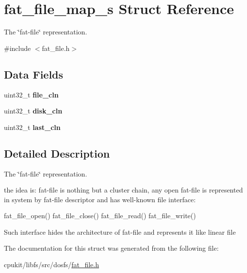 \hypertarget{structfat__file__map__s}{}\section{fat\+\_\+file\+\_\+map\+\_\+s Struct Reference}
\label{structfat__file__map__s}


The \char`\"{}fat-\/file\char`\"{} representation.  




{\ttfamily \#include $<$fat\+\_\+file.\+h$>$}

\subsection*{Data Fields}
\begin{DoxyCompactItemize}
\item 
\mbox{\label{structfat__file__map__s_a7dabe41f4a3cbb39490969db1c1d24f1}} 
uint32\+\_\+t {\bfseries file\+\_\+cln}
\item 
\mbox{\label{structfat__file__map__s_a01d4ec84a60b7ed09d088289dde42d85}} 
uint32\+\_\+t {\bfseries disk\+\_\+cln}
\item 
\mbox{\label{structfat__file__map__s_a14e861cadc0ea8ada504ff677072e606}} 
uint32\+\_\+t {\bfseries last\+\_\+cln}
\end{DoxyCompactItemize}


\subsection{Detailed Description}
The \char`\"{}fat-\/file\char`\"{} representation. 

the idea is\+: fat-\/file is nothing but a cluster chain, any open fat-\/file is represented in system by fat-\/file descriptor and has well-\/known file interface\+:

fat\+\_\+file\+\_\+open() fat\+\_\+file\+\_\+close() fat\+\_\+file\+\_\+read() fat\+\_\+file\+\_\+write()

Such interface hides the architecture of fat-\/file and represents it like linear file 

The documentation for this struct was generated from the following file\+:\begin{DoxyCompactItemize}
\item 
cpukit/libfs/src/dosfs/\mbox{\hyperlink{fat__file_8h}{fat\+\_\+file.\+h}}\end{DoxyCompactItemize}
